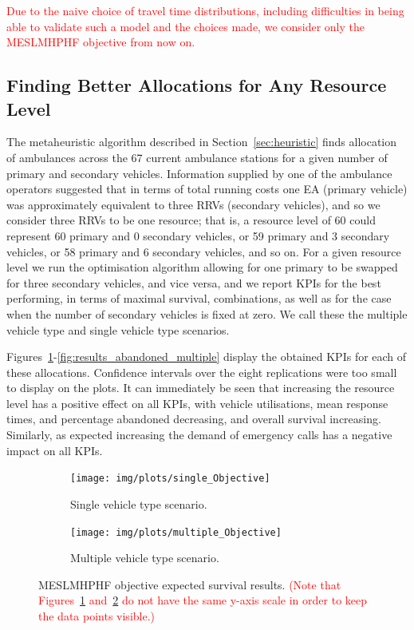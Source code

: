 \documentclass[numbers,webpdf,imaman]{ima-authoring-template}%
\begin{document}
\textcolor{red}{
Due to the naive choice of travel time distributions, including difficulties in
being able to validate such a model and the choices made, we consider only the
MESLMHPHF objective from now on.
}


\subsection{Finding Better Allocations for Any Resource Level}\label{sec:vehicle_numbers}
The metaheuristic algorithm described in Section~\ref{sec:heuristic} finds
allocation of ambulances across the 67 current ambulance stations for a given
number of primary and secondary vehicles. Information supplied by one of the
ambulance operators suggested that in terms of total running costs one EA
(primary vehicle) was approximately equivalent to three RRVs (secondary
vehicles), and so we consider three RRVs to be one resource; that is, a
resource level of 60 could represent 60 primary and 0 secondary vehicles, or
59 primary and 3 secondary vehicles, or 58 primary and 6 secondary vehicles,
and so on. For a given resource level we run the optimisation algorithm allowing
for one primary to be swapped for three secondary vehicles, and vice versa,
and we report KPIs for the best performing, in terms of maximal
survival, combinations, as well as for the case when the number of secondary
vehicles is fixed at zero. We call these the multiple vehicle type and single
vehicle type scenarios.

Figures~\ref{fig:results_objective_single}-\ref{fig:results_abandoned_multiple}
display the obtained KPIs for each of these allocations. Confidence intervals
over the eight replications were too small to display on the plots. It can
immediately be seen that increasing the resource level has a positive effect on
all KPIs, with vehicle utilisations, mean response times, and percentage
abandoned decreasing, and overall survival increasing. Similarly, as expected
increasing the demand of emergency calls has a negative impact on all KPIs.

\begin{figure}[htb!]
\begin{center}
\begin{subfigure}{0.4\textwidth}
\texttt{[image: img/plots/single\_Objective]}
\caption{Single vehicle type scenario.}
\label{fig:results_objective_single}
\end{subfigure}
\begin{subfigure}{0.4\textwidth}
\texttt{[image: img/plots/multiple\_Objective]}
\caption{Multiple vehicle type scenario.}
\label{fig:results_objective_multiple}
\end{subfigure}
\end{center}
\caption{MESLMHPHF objective expected survival results. \textcolor{red}{(Note that Figures~\ref{fig:results_objective_single} and~\ref{fig:results_objective_multiple} do not have the same y-axis scale in order to keep the data points visible.)}}
\label{fig:results_objective}
\end{figure}
\end{document}
